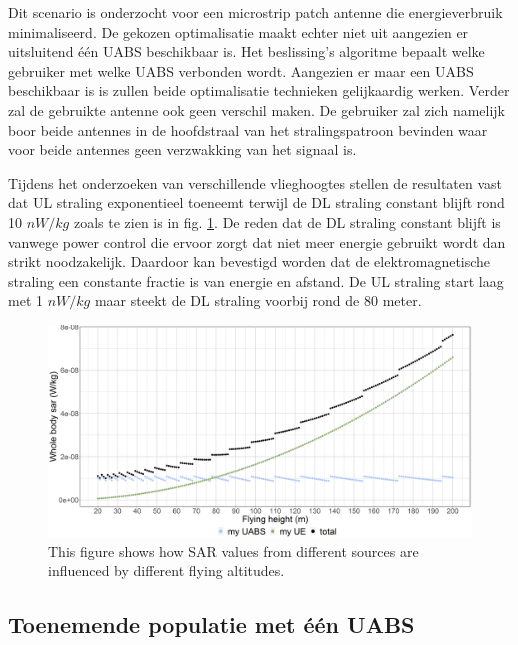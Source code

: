 \documentclass[twocolumn]{phdsymp_dutch}
\begin{document}
Dit scenario is onderzocht voor een microstrip patch antenne die energieverbruik minimaliseerd.
De gekozen optimalisatie maakt echter niet uit aangezien er uitsluitend \'e\'en \gls{UABS} beschikbaar is.
Het beslissing's algoritme bepaalt welke gebruiker met welke \gls{UABS} verbonden wordt.
Aangezien er maar een \gls{UABS} beschikbaar is is zullen beide optimalisatie technieken gelijkaardig werken.
Verder zal de gebruikte antenne ook geen verschil maken. 
De gebruiker zal zich namelijk boor beide antennes in de hoofdstraal van het stralingspatroon 
bevinden waar voor beide antennes geen verzwakking van het signaal is.

Tijdens het onderzoeken van verschillende vlieghoogtes stellen de resultaten vast  dat
\gls{UL} straling exponentieel toeneemt terwijl de \gls{DL} straling constant blijft rond 
10 $nW/kg$ zoals te zien is in fig. \ref{fig:s1_fhsar}. De reden dat de \gls{DL} straling constant blijft is vanwege power control die ervoor zorgt
dat niet meer energie gebruikt wordt dan strikt noodzakelijk. 
Daardoor kan bevestigd worden dat de elektromagnetische straling een constante fractie is van energie en afstand.
De \gls{UL} straling start laag met 1 $nW/kg$ maar steekt de \gls{DL} straling voorbij rond de 80 meter.

\begin{figure}[]
\centering
  \includegraphics[width=\linewidth]{s1/fhvssar.png}
  \caption{This figure shows how SAR values from different sources are influenced by different flying altitudes.}
  \label{fig:s1_fhsar}
\end{figure}

\subsection{Toenemende populatie met \'e\'en UABS}
\end{document}
